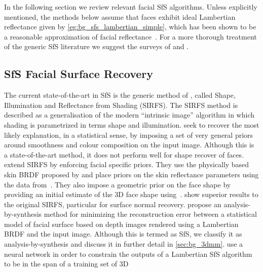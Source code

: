 In the following section we review relevant facial SfS algorithms. Unless
explicitly mentioned, the methods below assume that faces exhibit ideal
Lambertian reflectance given by \cref{eg:bg_sfs_lambertian_simple},
which has been shown to be a reasonable approximation
of facial reflectance~\cite{Sirovich:1987te,georghiades2001fromfew,%
Basri:2003ie,turk1991eigenfaces,Hallinan:1994dz,ramamoorthi2002analytic,%
ramamoorthi2001relationship,shashua1997photometric,moses1993face,%
marschner1999image}. For a more
thorough treatment of the generic SfS literature we suggest the surveys
of \citet{zhang1999shape} and \citet{durou2008numerical}.
\subsection{SfS Facial Surface Recovery}
The current state-of-the-art in SfS is the generic method of
\citet{barron2015shape}, called
Shape, Illumination and Reflectance from Shading (SIRFS). The SIRFS method is
described as a generalisation of the modern ``intrinsic image'' algorithm in
which shading is parametrized in terms shape and illumination.
\citet{barron2015shape} seek to recover the most likely explanation, in a
statistical sense, by imposing a set of very general priors around smoothness
and colour composition on the input image. Although this is a state-of-the-art
method, it does not perform well for shape recover of faces.
\citet{li2014intrinsic} extend SIRFS by enforcing facial specific priors. They
use the physically based skin BRDF proposed by \citet{weyrich2006analysis} and
place priors on the skin reflectance parameters using the data
from~\cite{weyrich2006analysis}. They also impose a geometric prior on the face
shape by providing an initial estimate of the 3D face shape
using~\cite{Yang:2011gj}. \citet{li2014intrinsic} show superior results to the
original SIRFS, particular for surface normal recovery.
\citet{atick1996statistical} propose an analysis-by-synthesis method
for minimizing the reconstruction error between a statistical model of facial
surface based on depth images rendered using a Lambertian BRDF and the input
image. Although this is termed as SfS, we classify it as analysis-by-synthesis
and discuss it in further detail in \cref{sec:bg_3dmm}.
\citet{yuan2002sfs} use a neural network in order to constrain the outputs
of a Lambertian SfS algorithm to be in the span of a training set of 3D
